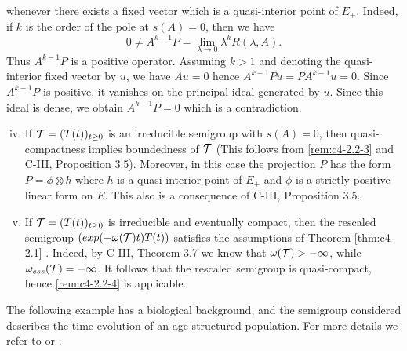 
whenever there exists a fixed vector which is a quasi-interior point of $E_{+}$.
Indeed, if $k$ is the order of the pole at $s(A) = 0$, then we have 
\[
0 \neq A^{k-1}P = \lim_{\lambda \to 0} \lambda^{k}R(\lambda,A).
\]
Thus $A^{k-1}P$ is a positive operator.
Assuming $k > 1$ and denoting the quasi-interior fixed vector by $u$, we have $Au = 0$ hence $A^{k-1}Pu = PA^{k-1}u = 0$.
Since $A^{k-1}P$ is positive, it vanishes on the principal ideal generated by $u$.
Since this ideal is dense, we obtain $A^{k-1}P = 0$ which is a contradiction.

\begin{enumerate}[(i)]
\setcounter{enumi}{3}
\item  \label{rem:c4-2.2-4}
If $\mathcal{T} = (T(t))_{t \geq 0}$ is an irreducible semigroup with $s(A) = 0$, then quasi-compactness implies boundedness of $\mathcal{T}$ (This follows from \ref{rem:c4-2.2-3} and C-III, Proposition 3.5).
Moreover, in this case the projection $P$ has the form $P = \phi \otimes h$ where $h$ 
is a quasi-interior point of $E_{+}$ and $\phi$ is a strictly positive linear form on $E$.
This also is a consequence of C-III, Proposition 3.5.
\item  \label{rem:c4-2.2-5}
If $\mathcal{T} = (T(t))_{t \geq 0}$ is irreducible and eventually compact, then the rescaled semigroup $(exp(-\omega(\mathcal{T})t)T(t))$ satisfies the assumptions of Theorem \ref{thm:c4-2.1} .
Indeed, by C-III, Theorem 3.7 we know that $\omega(\mathcal{T}) > -\infty$, while $\omega_{ess}(\mathcal{T}) = -\infty$.
It follows that the rescaled semigroup is quasi-compact, hence \ref{rem:c4-2.2-4} is applicable.
\end{enumerate}

The following example has a biological background, and the semigroup considered describes the time evolution of an age-structured population.
For more details we refer to \citet{greiner:1984a} or \citet{webb:1984}.

